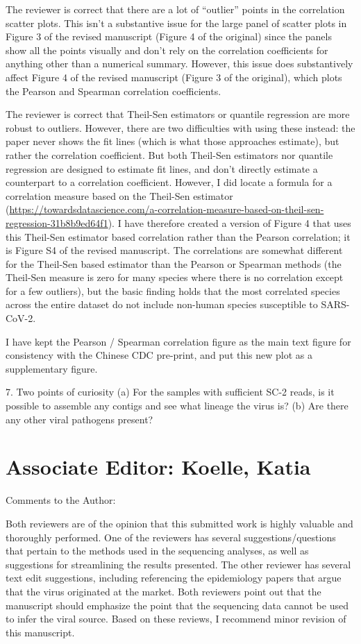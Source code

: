 \documentclass[11pt, oneside]{article}   	%
\newcommand{\response}[1]{{\color{black}#1}}
\begin{document}
\response{
The reviewer is correct that there are a lot of ``outlier'' points in the correlation scatter plots.
This isn't a substantive issue for the large panel of scatter plots in Figure 3 of the revised manuscript (Figure 4 of the original) since the panels show all the points visually and don't rely on the correlation coefficients for anything other than a numerical summary.
However, this issue does substantively affect Figure 4 of the revised manuscript (Figure 3 of the original), which plots the Pearson and Spearman correlation coefficients.

The reviewer is correct that Theil-Sen estimators or quantile regression are more robust to outliers.
However, there are two difficulties with using these instead: the paper never shows the fit lines (which is what those approaches estimate), but rather the correlation coefficient.
But both Theil-Sen estimators nor quantile regression are designed to estimate fit lines, and don't directly estimate a counterpart to a correlation coefficient.
However, I did locate a formula for a correlation measure based on the Theil-Sen estimator (\url{https://towardsdatascience.com/a-correlation-measure-based-on-theil-sen-regression-31b8b9ed64f1}).
I have therefore created a version of Figure 4 that uses this Theil-Sen estimator based correlation rather than the Pearson correlation; it is Figure S4 of the revised manuscript.
The correlations are somewhat different for the Theil-Sen based estimator than the Pearson or Spearman methods (the Theil-Sen measure is zero for many species where there is no correlation except for a few outliers), but the basic finding holds that the most correlated species across the entire dataset do not include non-human species susceptible to SARS-CoV-2.

I have kept the Pearson / Spearman correlation figure as the main text figure for consistency with the Chinese CDC pre-print, and put this new plot as a supplementary figure.
}

7. Two points of curiosity
   (a) For the samples with sufficient SC-2 reads, is it possible to assemble any contigs and see what lineage the virus is?
   (b) Are there any other viral pathogens present?


\section*{Associate Editor: Koelle, Katia}

Comments to the Author:

Both reviewers are of the opinion that this submitted work is highly valuable and thoroughly performed. One of the reviewers has several suggestions/questions that pertain to the methods used in the sequencing analyses, as well as suggestions for streamlining the results presented. The other reviewer has several text edit suggestions, including referencing the epidemiology papers that argue that the virus originated at the market. Both reviewers point out that the manuscript should emphasize the point that the sequencing data cannot be used to infer the viral source. Based on these reviews, I recommend minor revision of this manuscript.

\color{black}

{\small

}
\end{document}
